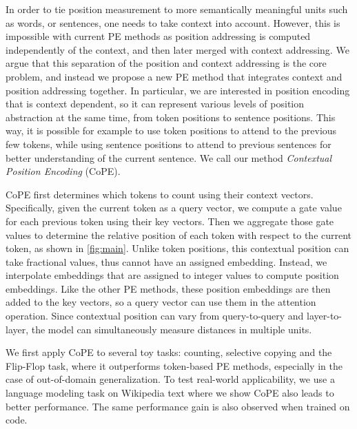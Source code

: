 \documentclass{article}
\newcommand{\oursfull}{Contextual Position Encoding}
\newcommand{\ours}{CoPE\xspace}
\begin{document}
In order to tie position measurement to more semantically meaningful units such as words, or sentences, one needs to take context into account.
However, this is impossible with current PE methods as position addressing is computed independently of the context, and then later merged with context addressing. 
We argue that this separation of the position and context addressing is the core problem, and instead we propose a new PE method that integrates
context and position addressing together.
In particular, we are interested in position encoding that is context dependent, so it can represent various levels of position abstraction at the same time, from token positions to sentence positions. 
This way, it is  possible for example to use token positions to attend to the previous few tokens, while using sentence positions to attend to previous sentences for better understanding of the current sentence.
We call our method \emph{\oursfull{}} (\ours{}).

\ours{} first determines which tokens to count using their context vectors.
Specifically, given the current token as a query vector, we compute a gate value for each previous token using their key vectors. 
Then we aggregate those gate values to determine the relative position of each token with respect to the current token, as shown in \cref{fig:main}.
Unlike token positions, this contextual position can take fractional values, thus cannot have an assigned embedding.
Instead, we interpolate embeddings that are assigned to integer values to compute position embeddings.
Like the other PE methods, these position embeddings are then added to the key vectors, so a query vector can use them in the attention operation.
Since contextual position can vary from query-to-query and layer-to-layer, the model can simultaneously measure distances in multiple units.

We first apply \ours{} to several toy tasks: counting, selective copying and the Flip-Flop task,
where it outperforms token-based PE methods, especially in the case of out-of-domain generalization.
To test real-world applicability, we use a language modeling task on Wikipedia text where we show \ours{} also leads to better performance.
The same performance gain is also observed when trained on code. 
\end{document}
